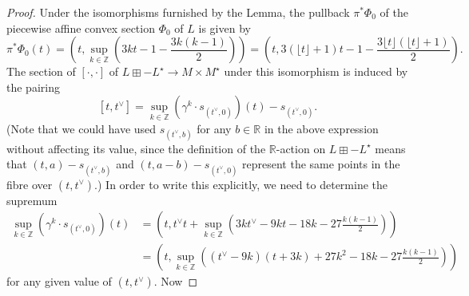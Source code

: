 \documentclass{article}
\newcommand{\RR}{\mathbb{R}}
\newcommand{\ZZ}{\mathbb{Z}}
\begin{document}
\begin{proof}
Under the isomorphisms furnished by the Lemma, the pullback $\pi^*\Phi_0$ of the piecewise affine convex section $\Phi_0$ of $L$  is given by 
\[
\pi^*\Phi_0(t)=\left(t,\sup_{k\in\ZZ}\left(3kt-1-\frac{3k(k-1)}{2}\right)\right) = \left(t,3(\lfloor t \rfloor +1)t-1-\frac{3\lfloor t \rfloor(\lfloor t \rfloor+1)}{2}\right).
\]
The section of $[\cdot,\cdot]$ of $L\boxplus-L^\star \to M\times M^\star$ under this isomorphism is induced by the pairing
\[
[t,t^\vee] = \sup_{k\in\ZZ}(\gamma^k \cdot s_{(t^\vee,0)})(t) - s_{(t^\vee,0)}.
\]
(Note that we could have used $s_{(t^\vee,b)}$ for any $b\in \RR$ in the above expression without affecting its value, since the definition of the $\RR$-action on $L\boxplus-L^\star$ means that $(t,a)-s_{(t^\vee,b)}$ and $(t,a-b)-s_{(t^\vee,0)}$ represent the same points in the fibre over $(t,t^\vee)$.) In order to write this explicitly, we need to determine the supremum
\begin{align*}
    \sup_{k\in\ZZ}(\gamma^k \cdot s_{(t^\vee,0)})(t) &= \left(t,t^\vee t +\sup_{k\in\ZZ}\left(3kt^\vee-9kt-18k-27\frac{k(k-1)}{2}\right)\right)\\
    &=\left(t,\sup_{k\in\ZZ} \left((t^\vee-9k)(t+3k)+27k^2-18k-27\frac{k(k-1)}{2}\right)\right)
\end{align*}
for any given value of $(t,t^\vee)$. Now 


\end{proof}
\end{document}
